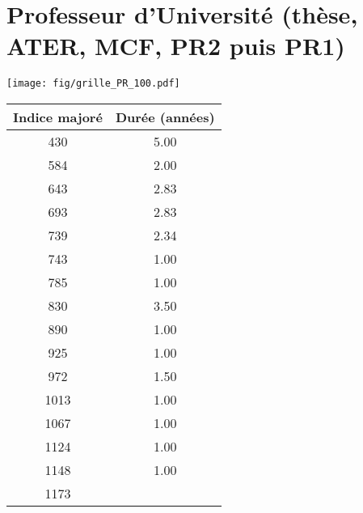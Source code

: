 \newpage 
 
\chapter{Professeur d'Université (thèse, ATER, MCF, PR2 puis PR1)} 

\begin{minipage}{0.55\linewidth}\texttt{[image: fig/grille\_PR\_100.pdf]}\end{minipage} 
\begin{minipage}{0.3\linewidth} 
 \begin{center} 

\begin{tabular}[htb]{|c|c|} 
\hline 
 Indice majoré &  Durée (années) \\ 
\hline \hline 
 430 &  5.00 \\ 
\hline 
 584 &  2.00 \\ 
\hline 
 643 &  2.83 \\ 
\hline 
 693 &  2.83 \\ 
\hline 
 739 &  2.34 \\ 
\hline 
 743 &  1.00 \\ 
\hline 
 785 &  1.00 \\ 
\hline 
 830 &  3.50 \\ 
\hline 
 890 &  1.00 \\ 
\hline 
 925 &  1.00 \\ 
\hline 
 972 &  1.50 \\ 
\hline 
 1013 &  1.00 \\ 
\hline 
 1067 &  1.00 \\ 
\hline 
 1124 &  1.00 \\ 
\hline 
 1148 &  1.00 \\ 
\hline 
 1173 &   \\ 
\hline 
\hline 
\end{tabular} 
\end{center} 
 \end{minipage} 

~\\ 
 


   
 \localtableofcontents 

